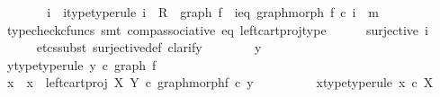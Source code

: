 \begin{isabellebody}
\ \ \ \ \isamarkupfalse%
\ \isamarkupfalse%
\ i\ \ i{\isacharunderscore}{\kern0pt}type{\isacharbrackleft}{\kern0pt}type{\isacharunderscore}{\kern0pt}rule{\isacharbrackright}{\kern0pt}{\isacharcolon}{\kern0pt}\ {\isachardoublequoteopen}i\ {\isacharcolon}{\kern0pt}\ R\ {\isasymrightarrow}\ graph\ f{\isachardoublequoteclose}\ \ i{\isacharunderscore}{\kern0pt}eq{\isacharcolon}{\kern0pt}\ {\isachardoublequoteopen}graph{\isacharunderscore}{\kern0pt}morph\ f\ {\isasymcirc}\isactrlsub c\ i\ {\isacharequal}{\kern0pt}\ m{\isachardoublequoteclose}\isanewline
\ \ \ \ \ \ \isamarkupfalse%
\ {\isacharparenleft}{\kern0pt}typecheck{\isacharunderscore}{\kern0pt}cfuncs{\isacharcomma}{\kern0pt}\ smt\ comp{\isacharunderscore}{\kern0pt}associative{}\ eq\ left{\isacharunderscore}{\kern0pt}cart{\isacharunderscore}{\kern0pt}proj{\isacharunderscore}{\kern0pt}type{\isacharparenright}{\kern0pt}\isanewline
\ \ \ \ \isamarkupfalse%
\ {\isachardoublequoteopen}surjective\ i{\isachardoublequoteclose}\isanewline
\ \ \ \ \isamarkupfalse%
\ {\isacharparenleft}{\kern0pt}etcs{\isacharunderscore}{\kern0pt}subst\ surjective{\isacharunderscore}{\kern0pt}def{}{\isacharcomma}{\kern0pt}\ clarify{\isacharparenright}{\kern0pt}\isanewline
\ \ \ \ \ \ \isamarkupfalse%
\ y{\isacharprime}{\kern0pt}\isanewline
\ \ \ \ \ \ \isamarkupfalse%
\ y{\isacharprime}{\kern0pt}{\isacharunderscore}{\kern0pt}type{\isacharbrackleft}{\kern0pt}type{\isacharunderscore}{\kern0pt}rule{\isacharbrackright}{\kern0pt}{\isacharcolon}{\kern0pt}\ {\isachardoublequoteopen}y{\isacharprime}{\kern0pt}\ {\isasymin}\isactrlsub c\ graph\ f{\isachardoublequoteclose}\isanewline
\isanewline
\ \ \ \ \ \ \isamarkupfalse%
\ x\ \ {\isachardoublequoteopen}x\ {\isacharequal}{\kern0pt}\ left{\isacharunderscore}{\kern0pt}cart{\isacharunderscore}{\kern0pt}proj\ X\ Y\ {\isasymcirc}\isactrlsub c\ graph{\isacharunderscore}{\kern0pt}morph{\isacharparenleft}{\kern0pt}f{\isacharparenright}{\kern0pt}\ {\isasymcirc}\isactrlsub c\ y{\isacharprime}{\kern0pt}{\isachardoublequoteclose}\isanewline
\ \ \ \ \ \ \isamarkupfalse%
\ \isamarkupfalse%
\ x{\isacharunderscore}{\kern0pt}type{\isacharbrackleft}{\kern0pt}type{\isacharunderscore}{\kern0pt}rule{\isacharbrackright}{\kern0pt}{\isacharcolon}{\kern0pt}\ {\isachardoublequoteopen}x\ {\isasymin}\isactrlsub c\ X{\isachardoublequoteclose}\isanewline
\ \ \ \ \ \ \ \ \isamarkupfalse%

\end{isabellebody}
